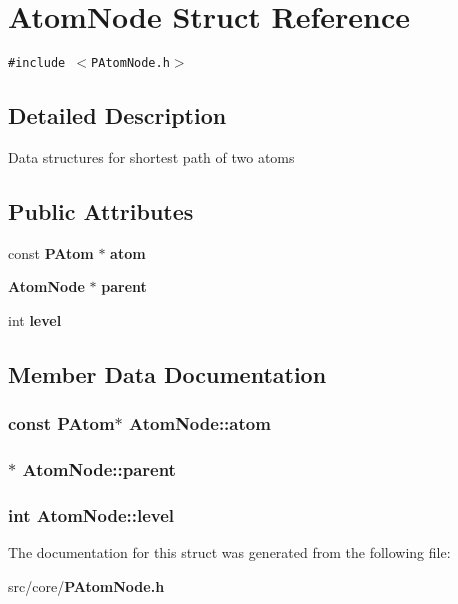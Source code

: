 \section{Atom\-Node Struct Reference}
\label{structAtomNode}
{\tt \#include $<$PAtom\-Node.h$>$}



\subsection{Detailed Description}
Data structures for shortest path of two atoms 

\subsection*{Public Attributes}
\begin{CompactItemize}
\item 
const {\bf PAtom} $\ast$ {\bf atom}
\item 
{\bf Atom\-Node} $\ast$ {\bf parent}
\item 
int {\bf level}
\end{CompactItemize}


\subsection{Member Data Documentation}
\subsubsection{\setlength{\rightskip}{0pt plus 5cm}const {\bf PAtom}$\ast$ {\bf Atom\-Node::atom}}\label{structAtomNode_95216301acc6d0ad2bf4875986ca07d2}


\subsubsection{$\ast$ {\bf Atom\-Node::parent}}\label{structAtomNode_dbb94a5a780108a060203701e7e8aff9}


\subsubsection{\setlength{\rightskip}{0pt plus 5cm}int {\bf Atom\-Node::level}}\label{structAtomNode_48455d520f08e50f854d117fb773a9fa}




The documentation for this struct was generated from the following file:\begin{CompactItemize}
\item 
src/core/{\bf PAtom\-Node.h}\end{CompactItemize}
